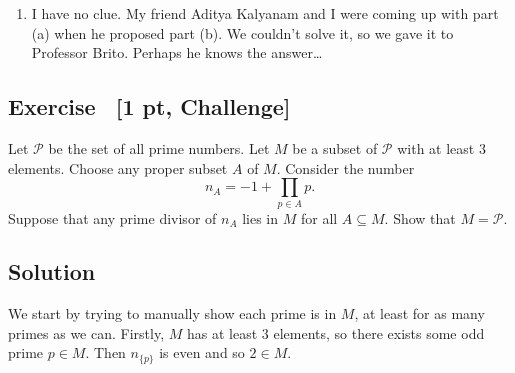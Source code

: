 \documentclass{article}
\newcounter{counter}
\newcommand{\Exercise}{Exercise \stepcounter{counter}\thecounter}
\begin{document}
\begin{enumerate}
        \vspace{2mm}
        \qquad Note that Figure \ref*{fig:E2Sb} forms Pascal's triangle. This is not a coincidence! Embedding each letter in the Cartesian plane starting with $K = (0, 0)$, the number of ways to reach coordinate $(i, j)$ is given by $\binom{i + j}{i}$. Hence another way to count the number of ways to spell KAHTRAS is by summing all the elements in row seven of Pascal's triangle, which is just $2^{6}$.
        
        \vspace{1.5mm}
        \qquad The number of strings spelling KAHTRAS for the entire diamond is then obtained by the formula $4 \times 2^{6} - 4$. (We need to subtract $4$ to compensate for the overcounting of the strings along the diamond's diagonals.) Finally, counting the total number of ways to spell SARTHAKAHTRAS for the entire diamond is given by $(4 \times 2^{6} - 4)^{2} = \boxed{63504}$.
        \item I have no clue. My friend Aditya Kalyanam and I were coming up with part (a) when he proposed part (b). We couldn't solve it, so we gave it to Professor Brito. Perhaps he knows the answer\dots
    \end{enumerate}

\pagebreak

\subsection*{\Exercise \ {\bf [1 pt, Challenge]}}
    Let $\mathcal{P}$ be the set of all prime numbers. Let $M$ be a subset of $\mathcal{P}$ with at least $3$ elements. Choose any proper subset $A$ of $M$. Consider the number $$n_{A} = -1 + \prod_{p \in A} p.$$ Suppose that any prime divisor of $n_{A}$ lies in $M$ for all $A \subseteq M$. Show that $M = \mathcal{P}$.
    

\subsection*{Solution}
    \qquad We start by trying to manually show each prime is in $M$, at least for as many primes as we can. Firstly, $M$ has at least $3$ elements, so there exists some odd prime $p \in M$. Then $n_{\{p\}}$ is even and so $2 \in M$.
    
\end{document}

